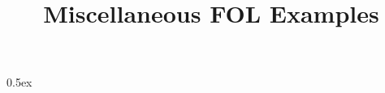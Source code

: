 \documentclass[11pt,a4paper]{article}
\begin{document}
\title{Miscellaneous FOL Examples}
\maketitle

\tableofcontents

\parindent 0pt\parskip 0.5ex

\end{document}
